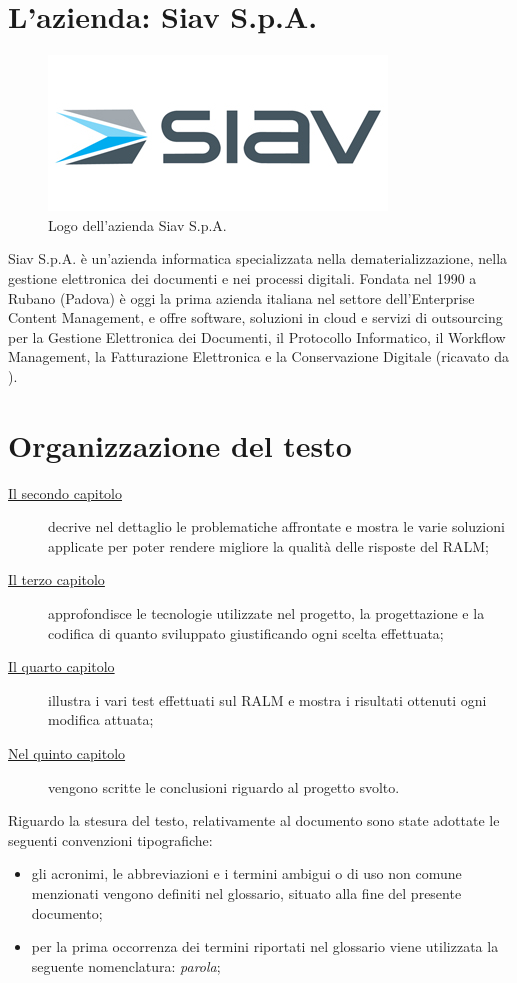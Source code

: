 \section{L'azienda: Siav S.p.A.}

\begin{figure}[!h] 
    \centering 
    \includegraphics[width=0.5\columnwidth]{images/logoSiav.jpg} 
    \caption{Logo dell'azienda Siav S.p.A.}
\end{figure}
\noindent Siav S.p.A. è un’azienda informatica specializzata nella dematerializzazione, nella gestione elettronica dei documenti e nei processi digitali.
Fondata nel 1990 a Rubano (Padova) è oggi la prima azienda italiana nel settore dell’Enterprise Content Management, e offre software, soluzioni in cloud e servizi di outsourcing per la Gestione Elettronica dei Documenti, il Protocollo Informatico, il Workflow Management, la Fatturazione Elettronica e la Conservazione Digitale
(ricavato da \cite{site:siav-spa}).


\section{Organizzazione del testo}

\begin{description}
    \item[{\hyperref[cap:analisi-preliminare]{Il secondo capitolo}}] decrive nel dettaglio le problematiche affrontate e mostra le varie soluzioni applicate per poter rendere migliore la qualità delle risposte del RALM;
    
    \item[{\hyperref[cap:progettazione-codifica]{Il terzo capitolo}}] approfondisce le tecnologie utilizzate nel progetto, la progettazione e la codifica di quanto sviluppato giustificando ogni scelta effettuata;
    
    \item[{\hyperref[cap:verifica-validazione]{Il quarto capitolo}}] illustra i vari test effettuati sul RALM e mostra i risultati ottenuti ogni modifica attuata;
    
    \item[{\hyperref[cap:conclusioni]{Nel quinto capitolo}}] vengono scritte le conclusioni riguardo al progetto svolto.
\end{description}

Riguardo la stesura del testo, relativamente al documento sono state adottate le seguenti convenzioni tipografiche:
\begin{itemize}
	\item gli acronimi, le abbreviazioni e i termini ambigui o di uso non comune menzionati vengono definiti nel glossario, situato alla fine del presente documento; 
	\item per la prima occorrenza dei termini riportati nel glossario viene utilizzata la seguente nomenclatura: \emph{parola}\glsfirstoccur;
\end{itemize}
